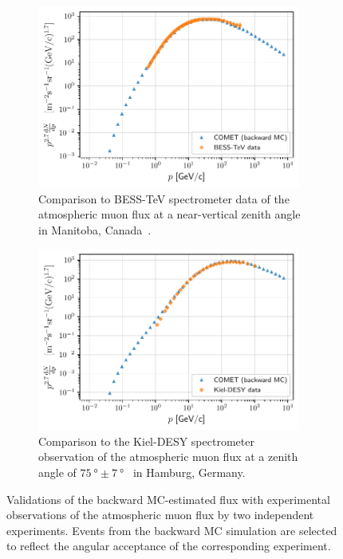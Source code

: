 \begin{figure}
    \centering
    \begin{subfigure}[t]{0.49\textwidth}
        \centering
        \includegraphics[width=0.95\textwidth]{chapter5/comparison_besstev.pdf}
        \caption{ Comparison to BESS-TeV spectrometer data of the atmospheric
        muon flux at a near-vertical zenith angle in Manitoba,
        Canada~\cite{besstev}. }
        \label{fig:bmc_validations_bess}
    \end{subfigure}
    \hfill
    \begin{subfigure}[t]{0.49\textwidth}
        \centering
        \includegraphics[width=0.95\textwidth]{chapter5/comparison_kieldesy.pdf}
        \caption{ 
            Comparison to the Kiel-DESY spectrometer observation of the
            atmospheric muon flux at a zenith angle of $\SI{75}{\degree} \pm
            \SI{7}{\degree}$~\cite{kieldesy} in Hamburg, Germany.}
        \label{fig:bmc_validations_kiel}
    \end{subfigure}
    \caption{ Validations of the backward MC-estimated flux with experimental
        observations of the atmospheric muon flux by two independent
        experiments. Events from the backward MC simulation are selected to
        reflect the angular acceptance of the corresponding experiment. }
    \label{fig:bmc_validations}
\end{figure}

